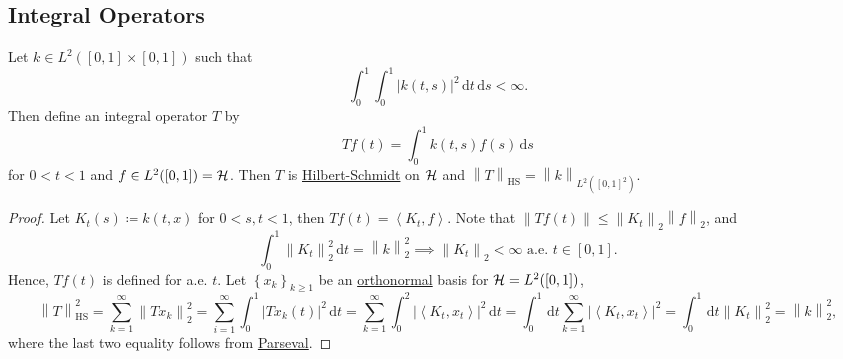 \subsection{Integral Operators}
\begin{proposition}
	Let \(k\in L^2([0, 1]\times [0, 1])\) such that
	\[
		\int _0^1 \int _0^1 \left\vert k(t, s) \right\vert ^{2} \,\mathrm{d} t\,\mathrm{d} s < \infty.
	\]
	Then define an integral operator \(T\) by
	\[
		Tf(t) = \int _0^1 k(t, s)f(s)\,\mathrm{d} s
	\]
	for \(0 < t < 1\) and \(f\in L^2([0, 1])= \mathcal{\MakeUppercase{h}} \). Then \(T\) is \hyperref[def:Hilbert-Schmidt-op]{Hilbert-Schmidt} on \(\mathcal{\MakeUppercase{h}} \) and \(\left\lVert T\right\rVert _{\mathrm{HS} }= \left\lVert k\right\rVert _{L^2([0, 1]^2)}\).
\end{proposition}
\begin{proof}
	Let \(K_t(s) \coloneqq k(t, x)\) for \(0<s, t<1\), then \(Tf(t) = \left\langle K_t, f \right\rangle \). Note that \(\left\lVert Tf(t)\right\rVert \leq \left\lVert K_t\right\rVert _2 \left\lVert f\right\rVert _2\), and
	\[
		\int_{0}^{1} \left\lVert K_t\right\rVert ^2_2 \,\mathrm{d}t = \left\lVert k\right\rVert _2^2 \implies \left\lVert K_t\right\rVert _2<\infty \text{ a.e. }t\in [0,1].
	\]
	Hence, \(Tf(t)\) is defined for a.e. \(t\). Let \(\left\{ x_k \right\} _{k \geq 1}\) be an \hyperref[def:orthonormal-system]{orthonormal} basis for \(\mathcal{\MakeUppercase{h}} =L^2([0, 1])\),
	\[
		\left\lVert T\right\rVert ^2 _{\mathrm{HS} }
		= \sum_{k=1}^{\infty} \left\lVert T x_{k} \right\rVert _2^2
		= \sum_{i=1}^{\infty} \int _0^1 \left\vert T x_{k} (t) \right\vert ^2 \,\mathrm{d} t
		= \sum_{k=1}^{\infty} \int _0^2 \left\vert \left\langle K_{t} , x_{t}  \right\rangle  \right\vert ^2 \,\mathrm{d} t
		= \int _0^1 \,\mathrm{d} t \sum_{k=1}^{\infty}\left\vert \left\langle K_{t} , x_{t}  \right\rangle  \right\vert ^2
		= \int _0^1 \,\mathrm{d} t \left\lVert K_t\right\rVert _2^2
		= \left\lVert k\right\rVert _2^2,
	\]
	where the last two equality follows from \hyperref[col:Parseval]{Parseval}.
\end{proof}

